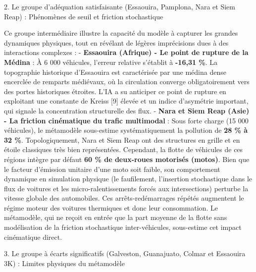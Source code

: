 \documentclass[10pt, a4paper]{article}
\begin{document}
2. Le groupe d'adéquation satisfaisante (Essaouira, Pamplona, Nara et
Siem Reap) : Phénomènes de seuil et friction stochastique

Ce groupe intermédiaire illustre la capacité du modèle à capturer les
grandes dynamiques physiques, tout en révélant de légères imprécisions
dues à des interactions complexes : - \textbf{Essaouira (Afrique) - Le
point de rupture de la Médina} : À 6 000 véhicules, l'erreur relative
s'établit à \textbf{-16,31 \%}. La topographie historique d'Essaouira
est caractérisée par une médina dense encerclée de remparts médiévaux,
où la circulation converge obligatoirement vers des portes historiques
étroites. L'IA a su anticiper ce point de rupture en exploitant une
constante de Kreiss {[}9{]} élevée et un indice d'asymétrie important,
qui signale la concentration structurelle des flux. - \textbf{Nara et
Siem Reap (Asie) - La friction cinématique du trafic multimodal} : Sous
forte charge (15 000 véhicules), le métamodèle sous-estime
systématiquement la pollution de \textbf{28 \% à 32 \%}.
Topologiquement, Nara et Siem Reap ont des structures en grille et en
étoile classiques très bien représentées. Cependant, la flotte de
véhicules de ces régions intègre par défaut \textbf{60 \% de deux-roues
motorisés (motos)}. Bien que le facteur d'émission unitaire d'une moto
soit faible, son comportement dynamique en simulation physique (le
faufilement, l'insertion stochastique dans le flux de voitures et les
micro-ralentissements forcés aux intersections) perturbe la vitesse
globale des automobiles. Ces arrêts-redémarrages répétés augmentent le
régime moteur des voitures thermiques et donc leur consommation. Le
métamodèle, qui ne reçoit en entrée que la part moyenne de la flotte
sans modélisation de la friction stochastique inter-véhicules,
sous-estime cet impact cinématique direct.

3. Le groupe à écarts significatifs (Galveston, Guanajuato, Colmar et
Essaouira 3K) : Limites physiques du métamodèle
\end{document}
